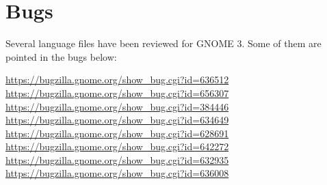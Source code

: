 \section{Bugs}

Several language files have been reviewed for GNOME 3. Some of them are pointed in the bugs below:

\noindent\url{https://bugzilla.gnome.org/show_bug.cgi?id=636512} \\
\noindent\url{https://bugzilla.gnome.org/show_bug.cgi?id=656307} \\
\noindent\url{https://bugzilla.gnome.org/show_bug.cgi?id=384446} \\
\noindent\url{https://bugzilla.gnome.org/show_bug.cgi?id=634649} \\
\noindent\url{https://bugzilla.gnome.org/show_bug.cgi?id=628691} \\
\noindent\url{https://bugzilla.gnome.org/show_bug.cgi?id=642272} \\
\noindent\url{https://bugzilla.gnome.org/show_bug.cgi?id=632935} \\
\noindent\url{https://bugzilla.gnome.org/show_bug.cgi?id=636008}

